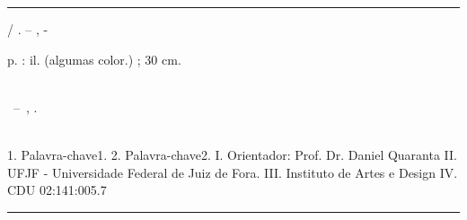 \documentclass[
	12pt,				%
	openright,			%
	twoside,			%
	a4paper,			%
	english,			%
	french,				%
	spanish,			%
	brazil				%
	]{abntex2}
\begin{document}
\frenchspacing 


\imprimircapa


\imprimirfolhaderosto*


%
%     
\begin{fichacatalografica}
	\vspace*{\fill}					%
	\hrule							%
	\begin{center}					%
	\begin{minipage}[c]{12.5cm}		%
	
	\imprimirautor
	
	\hspace{0.5cm} \imprimirtitulo  / \imprimirautor. --
	\imprimirlocal, \imprimirdata-
	
	\hspace{0.5cm} \pageref{LastPage} p. : il. (algumas color.) ; 30 cm.\\
	
	\hspace{0.5cm} \imprimirorientadorRotulo~\imprimirorientador\\
	
	\hspace{0.5cm}
	\parbox[t]{\textwidth}{\imprimirtipotrabalho~--~\imprimirinstituicao,
	\imprimirdata.}\\
	
	\hspace{0.5cm}
		1. Palavra-chave1.
		2. Palavra-chave2.
		I. Orientador: Prof. Dr. Daniel Quaranta
		II. UFJF - Universidade Federal de Juiz de Fora.
		III. Instituto de Artes e Design
		IV. \imprimirtitulo \\ 			
	
	\hspace{8.75cm} CDU 02:141:005.7\\
	
	\end{minipage}
	\end{center}
	\hrule
\end{fichacatalografica}
\end{document}
